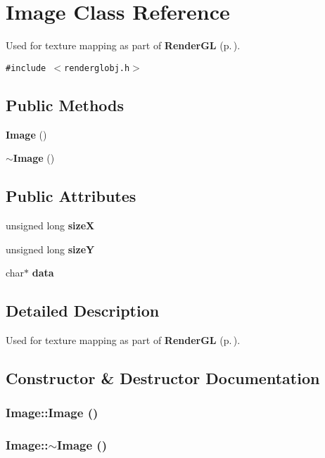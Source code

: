 \section{Image  Class Reference}
\label{classImage}
Used for texture mapping as part of {\bf Render\-GL} {\rm (p.\,\pageref{classRenderGL})}. 


{\tt \#include $<$renderglobj.h$>$}

\subsection*{Public Methods}
\begin{CompactItemize}
\item 
{\bf Image} ()
\item 
{\bf $\sim$Image} ()
\end{CompactItemize}
\subsection*{Public Attributes}
\begin{CompactItemize}
\item 
unsigned long {\bf size\-X}
\item 
unsigned long {\bf size\-Y}
\item 
char$\ast$ {\bf data}
\end{CompactItemize}


\subsection{Detailed Description}
Used for texture mapping as part of {\bf Render\-GL} {\rm (p.\,\pageref{classRenderGL})}.



\subsection{Constructor \& Destructor Documentation}
\subsubsection{\setlength{\rightskip}{0pt plus 5cm}Image::Image ()}\label{classImage_a0}


\subsubsection{\setlength{\rightskip}{0pt plus 5cm}Image::$\sim$Image ()}\label{classImage_a1}




